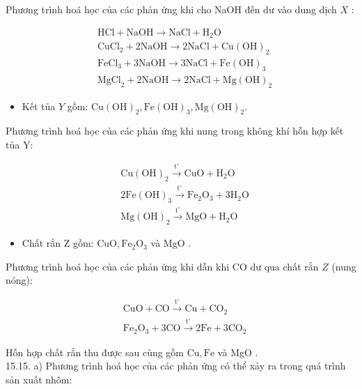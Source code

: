 \documentclass[10pt]{article}
\begin{document}
Phương trình hoá học của các phản ứng khi cho NaOH đến dư vào dung dịch $X$ :

$$
\begin{aligned}
& \mathrm{HCl}+\mathrm{NaOH} \rightarrow \mathrm{NaCl}+\mathrm{H}_{2} \mathrm{O} \\
& \mathrm{CuCl}_{2}+2 \mathrm{NaOH} \rightarrow 2 \mathrm{NaCl}+\mathrm{Cu}(\mathrm{OH})_{2} \\
& \mathrm{FeCl}_{3}+3 \mathrm{NaOH} \rightarrow 3 \mathrm{NaCl}+\mathrm{Fe}(\mathrm{OH})_{3} \\
& \mathrm{MgCl}_{2}+2 \mathrm{NaOH} \rightarrow 2 \mathrm{NaCl}+\mathrm{Mg}(\mathrm{OH})_{2}
\end{aligned}
$$

\begin{itemize}
  \item Kết tủa $Y$ gồm: $\mathrm{Cu}(\mathrm{OH})_{2}, \mathrm{Fe}(\mathrm{OH})_{3}, \mathrm{Mg}(\mathrm{OH})_{2}$.
\end{itemize}

Phương trình hoá học của các phản ứng khi nung trong không khí hỗn hợp kết tủa Y:

$$
\begin{aligned}
& \mathrm{Cu}(\mathrm{OH})_{2} \xrightarrow{\mathrm{t}^{\circ}} \mathrm{CuO}+\mathrm{H}_{2} \mathrm{O} \\
& 2 \mathrm{Fe}(\mathrm{OH})_{3} \xrightarrow{\mathrm{t}^{\circ}} \mathrm{Fe}_{2} \mathrm{O}_{3}+3 \mathrm{H}_{2} \mathrm{O} \\
& \mathrm{Mg}(\mathrm{OH})_{2} \xrightarrow{\mathrm{t}^{\circ}} \mathrm{MgO}+\mathrm{H}_{2} \mathrm{O}
\end{aligned}
$$

\begin{itemize}
  \item Chất rắn Z gồm: $\mathrm{CuO}, \mathrm{Fe}_{2} \mathrm{O}_{3}$ và MgO .
\end{itemize}

Phương trình hoá học của các phản ứng khi dẫn khi CO dư qua chất rắn $Z$ (nung nóng):

$$
\begin{aligned}
& \mathrm{CuO}+\mathrm{CO} \xrightarrow{\mathrm{t}^{\circ}} \mathrm{Cu}+\mathrm{CO}_{2} \\
& \mathrm{Fe}_{2} \mathrm{O}_{3}+3 \mathrm{CO} \xrightarrow{\mathrm{t}^{\circ}} 2 \mathrm{Fe}+3 \mathrm{CO}_{2}
\end{aligned}
$$

Hỗn hợp chất rắn thu được sau cùng gồm $\mathrm{Cu}, \mathrm{Fe}$ và MgO .\\
15.15. a) Phương trình hoá học của các phản ứng có thể xảy ra trong quá trình sản xuất nhôm:
\end{document}
